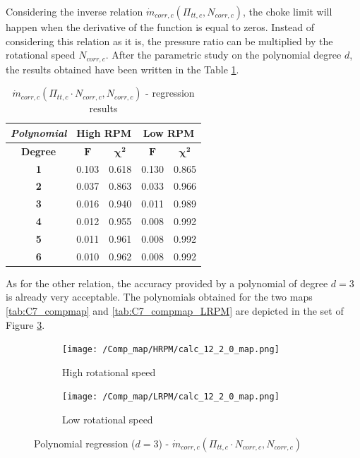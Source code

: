 Considering the inverse relation $\dot{m}_{corr,c}(\Pi_{tt,c},N_{corr,c})$, the choke limit will happen when the derivative of the function is equal to zeros. Instead of considering this relation as it is, the pressure ratio can be multiplied by the rotational speed $N_{corr,c}$. After the parametric study on the polynomial degree $d$, the results obtained have been written in the Table \ref{tab:C7_regcomp4}.

\begin{longtable}[c]{@{}ccc|cc@{}}
\caption{$\dot{m}_{corr,c}(\Pi_{tt,c}\cdot N_{corr,c},N_{corr,c})$ - regression results}
\label{tab:C7_regcomp4}\\
\toprule
\textit{\textbf{Polynomial}} & \multicolumn{2}{c|}{High RPM}  & \multicolumn{2}{c}{Low RPM}    \\* \midrule
\endfirsthead
%
\endhead
%
\bottomrule
\endfoot
%
\endlastfoot
%
\textbf{Degree}              & \multicolumn{1}{c}{$\mathbf{F}$} & \multicolumn{1}{c|}{$\mathbf{\chi^2}$} & \multicolumn{1}{c}{$\mathbf{F}$} & \multicolumn{1}{c}{$\mathbf{\chi^2}$} \\
\textbf{1}                   & 0.103      & 0.618             & 0.130      & 0.865             \\
\textbf{2}                   & 0.037      & 0.863             & 0.033      & 0.966             \\
\textbf{3}                   & 0.016      & 0.940             & 0.011      & 0.989             \\
\textbf{4}                   & 0.012      & 0.955             & 0.008      & 0.992             \\
\textbf{5}                   & 0.011      & 0.961             & 0.008      & 0.992             \\
\textbf{6}                   & 0.010      & 0.962             & 0.008      & 0.992             \\* \bottomrule
\end{longtable}

As for the other relation, the accuracy provided by a polynomial of degree $d=3$ is already very acceptable. The polynomials obtained for the two maps \ref{tab:C7_compmap} and \ref{tab:C7_compmap_LRPM} are depicted in the set of Figure \ref{fig:C7_polycomp_m}.

\begin{figure}[H]
    \centering
    \begin{subfigure}[b]{0.4\textwidth}
        \centering
        \texttt{[image: /Comp\_map/HRPM/calc\_12\_2\_0\_map.png]}
        \caption{High rotational speed}
        \label{fig:C7_polycomp_m_HRPM}
    \end{subfigure}
    \begin{subfigure}[b]{0.4\textwidth}
        \centering
        \texttt{[image: /Comp\_map/LRPM/calc\_12\_2\_0\_map.png]}
        \caption{Low rotational speed}
        \label{fig:C7_polycomp_m_LRPM}
    \end{subfigure}
    \caption{Polynomial regression ($d=3$) - $\dot{m}_{corr,c}(\Pi_{tt,c}\cdot N_{corr,c},N_{corr,c})$} \label{fig:C7_polycomp_m}
\end{figure}

